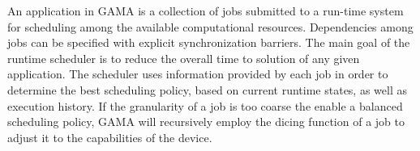 \documentclass[main.tex]{subfiles}
\begin{document}
An application in GAMA is a collection of jobs submitted to a run-time system for scheduling among the available computational resources. Dependencies among jobs can be specified with explicit synchronization barriers. The main goal of the runtime scheduler is to reduce the overall time to solution of any given application. The scheduler uses information provided by each job in order to determine the best scheduling policy, based on current runtime states, as well as execution history. If the granularity of a job is too coarse the enable a balanced scheduling policy, \ac{GAMA} will recursively employ the dicing function of a job to adjust it to the capabilities of the device.
\end{document}
